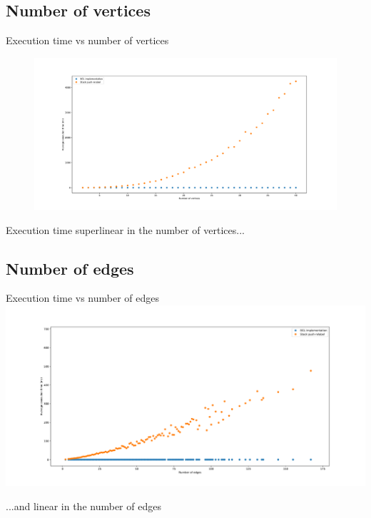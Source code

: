 \documentclass{beamer}
\begin{document}
\subsection{Number of vertices}
\begin{frame}[fragile]{Execution time vs number of vertices}
    \begin{figure}
    \includegraphics[width=1\textwidth]{time_vertices.pdf}
    \end{figure}

    \pause
    \begin{center}
        Execution time superlinear in the number of vertices...
    \end{center}
\end{frame}

\subsection{Number of edges}
\begin{frame}[fragile]{Execution time vs number of edges}
    \includegraphics[width=1\textwidth]{time_edges.pdf}

    \pause
    \begin{center}
        ...and linear in the number of edges
    \end{center}
\end{frame}
\end{document}
